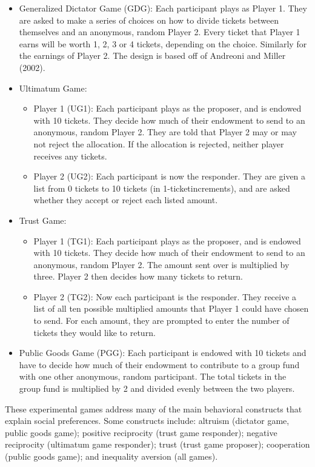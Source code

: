 \documentclass[12pt]{article}
\begin{document}
\begin{itemize}

\item{Generalized Dictator Game (GDG)}:  Each participant plays as Player 1. They are asked to make a series of choices on how to divide tickets between themselves and an anonymous, random Player 2. Every ticket that Player 1 earns will be worth 1, 2, 3 or 4 tickets, depending on the choice. Similarly for the earnings of Player 2. The design is based off of Andreoni and Miller (2002).
\item{Ultimatum Game}: 
	\begin{itemize}
		\item{Player 1 (UG1)}: Each participant plays as the proposer, and is endowed with 10 tickets. They decide how much of their endowment to send to an anonymous, random Player 2. They are told that Player 2 may or may not reject the allocation. If the allocation is rejected, neither player receives any tickets.
		\item{Player 2 (UG2)}: Each participant is now the responder. They are given a list from 0 tickets to 10 tickets (in 1-ticketincrements), and are asked whether they accept or reject each listed amount.
	\end{itemize}
\item{Trust Game}:
	\begin{itemize}
		\item{Player 1 (TG1)}: Each participant plays as the proposer, and is endowed with 10 tickets. They decide how much of their endowment to send to an anonymous, random Player 2. The amount sent over is multiplied by three. Player 2 then decides how many tickets to return. 
		\item{Player 2 (TG2)}: Now each participant is the responder. They receive a list of all ten possible multiplied amounts that Player 1 could have chosen to send. For each amount, they are prompted to enter the number of tickets they would like to return.
	\end{itemize}
\item{Public Goods Game (PGG)}: Each participant is endowed with 10 tickets and have to decide how much of their endowment to contribute to a group fund with one other anonymous, random participant. The total tickets in the group fund is multiplied by 2 and divided evenly between the two players.

\end{itemize}

These experimental games address many of the main behavioral constructs that explain social preferences. Some constructs include: altruism (dictator game, public goods game); positive reciprocity (trust game responder); negative reciprocity (ultimatum game responder); trust (trust game proposer); cooperation (public goods game); and inequality aversion (all games). 
\end{document}
